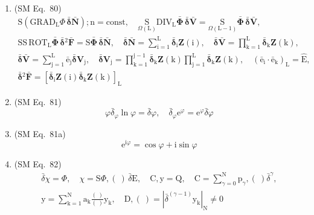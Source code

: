 \documentclass[12pt]{article}
\begin{document}
\begin{enumerate}[label=(\arabic*), series=formellist]
    \item (SM Eq.\ 80) 
    \[
    \begin{gathered}
    \mathrm{S}(\mathrm{GRAD}_\mathrm{L} \Phi \,\bar{\bm{\delta}}\bar{\mathbf{N}});\mathrm{n} = \mathrm{const}, \quad \underset{\Omega(\mathrm{L})}{\mathrm{S}}\mathrm{DIV}_\mathrm{L} \bar{\bm{\Phi}}\,\bar{\bm{\delta}}\bar{\mathbf{V}} = \underset{\Omega(\mathrm{L}-1)}{\mathrm{S}}\bar{\bm{\Phi}}\,\bar{\bm{\delta}}\bar{\mathbf{V}}, \\
    \mathrm{SS}\,\mathrm{ROT}_\mathrm{L} \bar{\bm{\Phi}}\,\bar{\bm{\delta}}{}^2\bar{\mathbf{F}} = \mathrm{S}\bar{\bm{\Phi}}\,\bar{\bm{\delta}}\bar{\mathbf{N}}, \quad \bar{\bm{\delta}}\bar{\mathbf{N}} = \sum_{\mathrm{i}=1}^\mathrm{L} \bar{\bm{\delta}}_\mathrm{i} \mathbf{Z}(\mathrm{i}), \quad \bar{\bm{\delta}}\bar{\mathbf{V}} = \prod_{\mathrm{k}=1}^\mathrm{L} \bar{\bm{\delta}}_\mathrm{k} \mathbf{Z}(\mathrm{k}), \\
    \bar{\bm{\delta}}\bar{\mathbf{V}} = \sum_{\mathrm{j}=1}^\mathrm{L} \bar{\mathrm{e}}_\mathrm{j} \bar{\bm{\delta}}\mathbf{V}_\mathrm{j}, \quad \bar{\bm{\delta}}\mathbf{V}_\mathrm{j} = \prod_{\mathrm{k}=1}^{\mathrm{j}-1}\bar{\bm{\delta}}_\mathrm{k} \mathbf{Z}(\mathrm{k}) \prod_{\mathrm{j}=1}^\mathrm{L} \bar{\bm{\delta}}_\mathrm{k} \mathbf{Z}(\mathrm{k}), \quad (\bar{\mathrm{e}}_\mathrm{i} \cdot \bar{\mathrm{e}}_\mathrm{k})_\mathrm{L} = \hat{\mathrm{E}}, \\
    \bar{\bm{\delta}}{}^2\bar{\mathbf{F}} = \left[ \bar{\bm{\delta}}_\mathrm{i} \mathbf{Z}(\mathrm{i}) \bar{\bm{\delta}}_\mathrm{k} \mathbf{Z}(\mathrm{k}) \right]_\mathrm{L}
    \end{gathered}
    \]

    \item (SM Eq.\ 81) 
    \[
    \varphi \bar{\delta}_\varphi \ln \varphi = \bar{\delta} \varphi, \quad \bar{\delta}_\varphi \mathrm{e}^\varphi = \mathrm{e}^\varphi \bar{\delta}\varphi
    \]

    \item (SM Eq.\ 81a) 
    \[
    \mathrm{e}^{\mathrm{i}\varphi} = \cos\varphi + \mathrm{i}\sin\varphi
    \]

    \item (SM Eq.\ 82) 
    \[
    \begin{gathered}
    \bar{\delta}\chi = \Phi, \quad \chi = \mathrm{S}\Phi, (\ )\,\bar{\delta}\mathrm{E}, \quad \mathrm{C}, \mathrm{y} = \mathrm{Q}, \quad \mathrm{C} = \sum_{\gamma=0}^\mathrm{N} \mathrm{p}_\gamma, (\ )\bar{\delta}^\gamma, \\
    \mathrm{y} = \sum_{\mathrm{k}=1}^\mathrm{N} \mathrm{a_k} \frac{(\ )}{(\ )} \mathrm{y_k}, \quad \mathrm{D}, (\ ) = \left| \bar{\delta}^{(\gamma-1)} \mathrm{y_k} \right|_\mathrm{N} \ne 0
    \end{gathered}
    \]


\end{enumerate}
\end{document}
